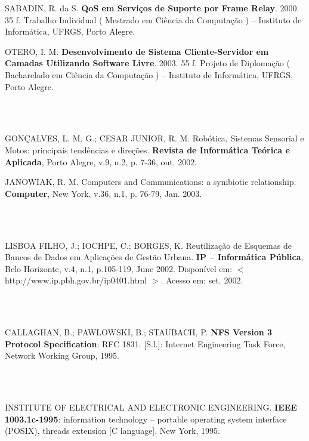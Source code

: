 \documentclass[rel_mlp]{iiufrgs}
\begin{document}
\noindent SABADIN, R. da S. {\bf QoS em Serviços de Suporte por Frame Relay}. 2000. 35 f. Trabalho Individual ( Mestrado em Ciência da Computação ) -- Instituto de Informática, UFRGS, Porto Alegre.

\noindent OTERO, I. M. {\bf Desenvolvimento de Sistema Cliente-Servidor em Camadas Utilizando Software Livre}. 2003. 55 f. Projeto de Diplomação ( Bacharelado em Ciência da Computação ) -- Instituto de Informática, UFRGS, Porto Alegre.

\noindent ~

\\

\noindent GONÇALVES, L. M. G.; CESAR JUNIOR, R. M. Robótica, Sistemas Sensorial e Motos: principais tendências e direções. {\bf Revista de Informática Teórica e Aplicada}, Porto Alegre, v.9, n.2, p. 7-36, out. 2002.

\noindent JANOWIAK, R. M. Computers and Communications: a symbiotic relationship. {\bf Computer}, New York, v.36, n.1, p. 76-79, Jan. 2003.

\noindent ~

\\

\noindent LISBOA FILHO, J.; IOCHPE, C.; BORGES, K. Reutilização de Esquemas de Bancos de Dados em Aplicações de Gestão Urbana. {\bf IP -- Informática Pública}, Belo Horizonte, v.4, n.1, p.105-119, June 2002. Disponível em: $<$http://www.ip.pbh.gov.br/ip0401.html $>$. Acesso em: set. 2002.

\noindent ~

\\

\noindent CALLAGHAN, B.; PAWLOWSKI, B.; STAUBACH, P. {\bf NFS Version 3 Protocol Specification}: RFC 1831. [S.l.]: Internet Engineering Task Force, Network Working Group, 1995.

\noindent ~

\\

\noindent INSTITUTE OF ELECTRICAL AND ELECTRONIC ENGINEERING. {\bf IEEE 1003.1c-1995}: information technology -- portable operating system interface (POSIX), threads extension [C language]. New York, 1995.

\noindent ~

\\
\end{document}
